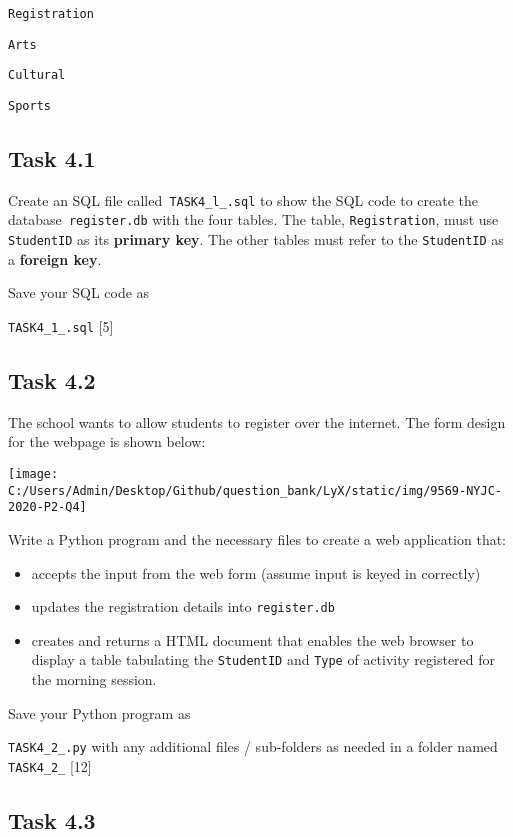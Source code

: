 \texttt{Registration }

\texttt{Arts}

\texttt{Cultural }

\texttt{Sports }

\subsection*{Task 4.1}

Create an SQL file called\texttt{ TASK4\_l\_<your name>.sql} to show
the SQL code to create the database\texttt{ register.db} with the
four tables. The table, \texttt{Registration}, must use \texttt{StudentID}
as its \textbf{primary key}. The other tables must refer to the \texttt{StudentID}
as a \textbf{foreign key}.

Save your SQL code as 

\texttt{TASK4\_1\_<your name>.sql}\hfill{} {[}5{]}

\subsection*{Task 4.2 }

The school wants to allow students to register over the internet.
The form design for the webpage is shown below: 
\begin{center}
\texttt{[image: C:/Users/Admin/Desktop/Github/question\_bank/LyX/static/img/9569-NYJC-2020-P2-Q4]}
\par\end{center}

Write a Python program and the necessary files to create a web application
that: 
\begin{itemize}
\item accepts the input from the web form (assume input is keyed in correctly) 
\item updates the registration details into \texttt{register.db} 
\item creates and returns a HTML document that enables the web browser to
display a table tabulating the \texttt{StudentID} and \texttt{Type}
of activity registered for the morning session. 
\end{itemize}
Save your Python program as

\texttt{TASK4\_2\_<your name>.py} with any additional files / sub-folders
as needed in a folder named \texttt{TASK4\_2\_<your name>} \hfill{}{[}12{]}

\subsection*{Task 4.3 }

